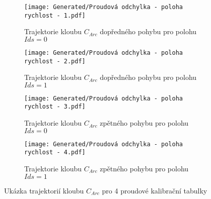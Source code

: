 \begin{landscapeimagepage}
    \begin{figure}[H]
        \centering
        \begin{subfigure}{.5\textheight}
            \centering
            \texttt{[image: Generated/Proudová odchylka - poloha rychlost - 1.pdf]}
            \caption{Trajektorie kloubu $C_{Arc}$ dopředného pohybu pro polohu $Ids = 0$}
            \label{fig: trajektorie kloubu CArc dopředného pohybu Ids=0}
        \end{subfigure}
        \vspace{0.5cm}
        \hspace{2.5cm}
        \begin{subfigure}{.5\textheight}
            \centering
            \texttt{[image: Generated/Proudová odchylka - poloha rychlost - 2.pdf]}
            \caption{Trajektorie kloubu $C_{Arc}$ dopředného pohybu pro polohu $Ids = 1$}
            \label{fig: trajektorie kloubu CArc dopředného pohybu Ids=1}
        \end{subfigure}
        \vspace{0.5cm}
        \begin{subfigure}{.5\textheight}
            \centering
            \texttt{[image: Generated/Proudová odchylka - poloha rychlost - 3.pdf]}
            \caption{Trajektorie kloubu $C_{Arc}$ zpětného pohybu pro polohu $Ids = 0$}
            \label{fig: trajektorie kloubu CArc zpětného pohybu Ids=0}
        \end{subfigure}
        \hspace{2.5cm}
        \begin{subfigure}{.5\textheight}
            \centering
            \texttt{[image: Generated/Proudová odchylka - poloha rychlost - 4.pdf]}
            \caption{Trajektorie kloubu $C_{Arc}$ zpětného pohybu pro polohu $Ids = 1$}
            \label{fig: trajektorie kloubu CArc zpětného pohybu Ids=1}
        \end{subfigure}
        \caption{Ukázka trajektorií kloubu $C_{Arc}$ pro 4 proudové kalibrační tabulky}
        \label{}
    \end{figure}
\end{landscapeimagepage}


